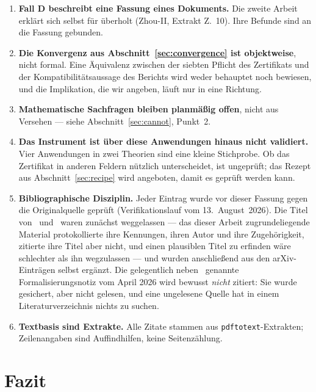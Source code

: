 \documentclass[11pt,a4paper]{article}
\theoremstyle{definition}
\newcommand{\anchor}[2]{(#1, Extrakt Z.~#2)}
\begin{document}
\begin{enumerate}
  zu lesen. Die der zweiten zugrundeliegende Substanzprüfung ist ihrerseits eine
  Form- und Substanzprüfung, keine Widerlegung; sie ist als
  Teil~5~\cite{GeigerSubstance2026} erschienen, ebenso wie die der ersten
  zugrundeliegende Quellenprüfung~\cite{GeigerGNC2026}.
\item \textbf{Fall D beschreibt eine Fassung eines Dokuments.} Die zweite Arbeit
  erklärt sich selbst für überholt \anchor{Zhou-II}{10}. Ihre Befunde sind an die
  Fassung gebunden.
\item \textbf{Die Konvergenz aus Abschnitt~\ref{sec:convergence} ist
  objektweise}, nicht formal. Eine Äquivalenz zwischen der siebten Pflicht des
  Zertifikats und der Kompatibilitätsaussage des Berichts wird weder behauptet
  noch bewiesen, und die Implikation, die wir angeben, läuft nur in eine Richtung.
\item \textbf{Mathematische Sachfragen bleiben planmäßig offen}, nicht aus
  Versehen --- siehe Abschnitt~\ref{sec:cannot}, Punkt~2.
\item \textbf{Das Instrument ist über diese Anwendungen hinaus nicht validiert.}
  Vier Anwendungen in zwei Theorien sind eine kleine Stichprobe. Ob das Zertifikat
  in anderen Feldern nützlich unterscheidet, ist ungeprüft; das Rezept aus
  Abschnitt~\ref{sec:recipe} wird angeboten, damit es geprüft werden kann.
\item \label{lim:biblio} \textbf{Bibliographische Disziplin.} Jeder Eintrag wurde
  vor dieser Fassung gegen die Originalquelle geprüft (Verifikationslauf vom
  13.~August~2026). Die Titel von~\cite{ZhouI} und~\cite{ZhouII} waren zunächst
  weggelassen --- das dieser Arbeit zugrundeliegende Material protokollierte ihre
  Kennungen, ihren Autor und ihre Zugehörigkeit, zitierte ihre Titel aber nicht,
  und einen plausiblen Titel zu erfinden wäre schlechter als ihn wegzulassen ---
  und wurden anschließend aus den arXiv-Einträgen selbst ergänzt. Die
  gelegentlich neben~\cite{LANA2026} genannte Formalisierungsnotiz vom April 2026
  wird bewusst \emph{nicht} zitiert: Sie wurde gesichert, aber nicht gelesen, und
  eine ungelesene Quelle hat in einem Literaturverzeichnis nichts zu suchen.
\item \textbf{Textbasis sind Extrakte.} Alle Zitate stammen aus
  \texttt{pdftotext}-Extrakten; Zeilenangaben sind Auffindhilfen, keine
  Seitenzählung.
\end{enumerate}

\section{Fazit}
\label{sec:conclusion}
\end{document}
